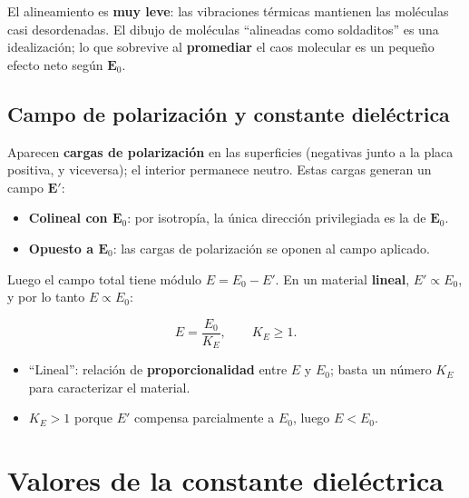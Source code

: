 \documentclass[12pt,a4paper]{article}
\begin{document}
El alineamiento es \textbf{muy leve}: las vibraciones térmicas mantienen
las moléculas casi desordenadas. El dibujo de moléculas
\enquote{alineadas como soldaditos} es una idealización; lo que
sobrevive al \textbf{promediar} el caos molecular es un pequeño efecto
neto según $\mathbf{E}_0$.

\subsection{Campo de polarización y constante dieléctrica}

Aparecen \textbf{cargas de polarización} en las superficies (negativas
junto a la placa positiva, y viceversa); el interior permanece neutro.
Estas cargas generan un campo $\mathbf{E}'$:

\begin{itemize}[nosep]
  \item \textbf{Colineal con $\mathbf{E}_0$}: por isotropía, la única
        dirección privilegiada es la de $\mathbf{E}_0$.
  \item \textbf{Opuesto a $\mathbf{E}_0$}: las cargas de polarización se
        oponen al campo aplicado.
\end{itemize}

Luego el campo total tiene módulo $E = E_0 - E'$. En un material
\textbf{lineal}, $E'\propto E_0$, y por lo tanto $E\propto E_0$:

\begin{keybox}
  \[
  \boxed{E = \frac{E_0}{K_E}}, \qquad K_E \geq 1.
  \]
  \begin{itemize}[nosep]
    \item \enquote{Lineal}: relación de \textbf{proporcionalidad} entre
          $E$ y $E_0$; basta un número $K_E$ para caracterizar el
          material.
    \item $K_E>1$ porque $E'$ compensa parcialmente a $E_0$, luego
          $E<E_0$.
  \end{itemize}
\end{keybox}



\section{Valores de la constante dieléctrica}
\end{document}
